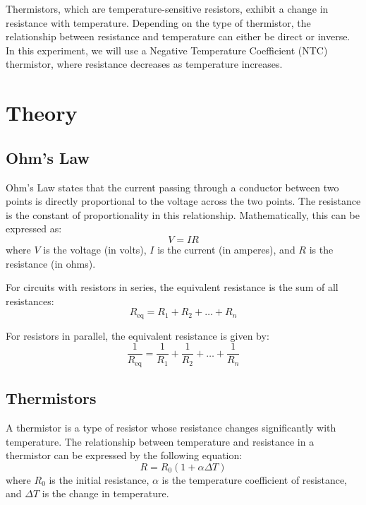\documentclass[journal]{IEEEtran}
\begin{document}
Thermistors, which are temperature-sensitive resistors, exhibit a change in resistance with temperature. Depending on the type of thermistor, the relationship between resistance and temperature can either be direct or inverse. In this experiment, we will use a Negative Temperature Coefficient (NTC) thermistor, where resistance decreases as temperature increases.

\section{Theory}
\subsection{Ohm's Law}
Ohm’s Law states that the current passing through a conductor between two points is directly proportional to the voltage across the two points. The resistance is the constant of proportionality in this relationship. Mathematically, this can be expressed as:
\begin{equation}
    V = IR
\end{equation}
where \( V \) is the voltage (in volts), \( I \) is the current (in amperes), and \( R \) is the resistance (in ohms).

For circuits with resistors in series, the equivalent resistance is the sum of all resistances:
\begin{equation}
    R_{\text{eq}} = R_1 + R_2 + \dots + R_n
\end{equation}

For resistors in parallel, the equivalent resistance is given by:
\begin{equation}
    \frac{1}{R_{\text{eq}}} = \frac{1}{R_1} + \frac{1}{R_2} + \dots + \frac{1}{R_n}
\end{equation}

\subsection{Thermistors}
A thermistor is a type of resistor whose resistance changes significantly with temperature. The relationship between temperature and resistance in a thermistor can be expressed by the following equation:
\begin{equation}
    R = R_0 (1 + \alpha \Delta T)
\end{equation}
where \( R_0 \) is the initial resistance, \( \alpha \) is the temperature coefficient of resistance, and \( \Delta T \) is the change in temperature.
\end{document}

